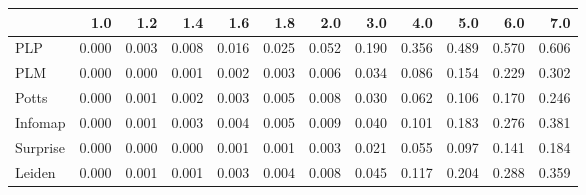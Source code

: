 \begin{tabular}{lrrrrrrrrrrr}
\toprule
{} &   1.0 &   1.2 &   1.4 &   1.6 &   1.8 &   2.0 &   3.0 &   4.0 &   5.0 &   6.0 &   7.0 \\
\midrule
PLP      & 0.000 & 0.003 & 0.008 & 0.016 & 0.025 & 0.052 & 0.190 & 0.356 & 0.489 & 0.570 & 0.606 \\
PLM      & 0.000 & 0.000 & 0.001 & 0.002 & 0.003 & 0.006 & 0.034 & 0.086 & 0.154 & 0.229 & 0.302 \\
Potts    & 0.000 & 0.001 & 0.002 & 0.003 & 0.005 & 0.008 & 0.030 & 0.062 & 0.106 & 0.170 & 0.246 \\
Infomap  & 0.000 & 0.001 & 0.003 & 0.004 & 0.005 & 0.009 & 0.040 & 0.101 & 0.183 & 0.276 & 0.381 \\
Surprise & 0.000 & 0.000 & 0.000 & 0.001 & 0.001 & 0.003 & 0.021 & 0.055 & 0.097 & 0.141 & 0.184 \\
Leiden   & 0.000 & 0.001 & 0.001 & 0.003 & 0.004 & 0.008 & 0.045 & 0.117 & 0.204 & 0.288 & 0.359 \\
\bottomrule
\end{tabular}
